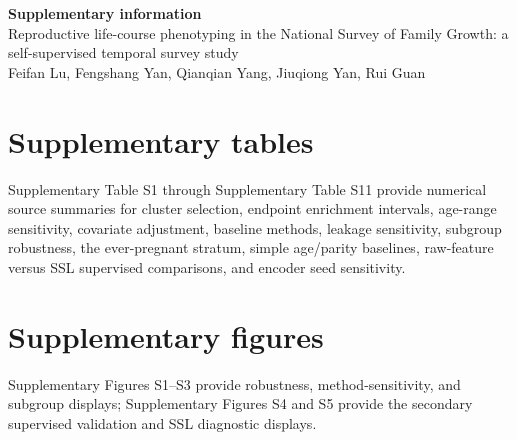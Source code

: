 \documentclass[11pt]{article}
\begin{document}
\begin{center}
{\Large\bfseries Supplementary information}\\[0.75em]
{\large Reproductive life-course phenotyping in the National Survey of Family Growth: a self-supervised temporal survey study}\\[0.75em]
Feifan Lu, Fengshang Yan, Qianqian Yang, Jiuqiong Yan, Rui Guan
\end{center}

\section*{Supplementary tables}

Supplementary Table S1 through Supplementary Table S11 provide numerical source summaries for cluster selection, endpoint enrichment intervals, age-range sensitivity, covariate adjustment, baseline methods, leakage sensitivity, subgroup robustness, the ever-pregnant stratum, simple age/parity baselines, raw-feature versus SSL supervised comparisons, and encoder seed sensitivity.























\clearpage

\section*{Supplementary figures}

Supplementary Figures S1--S3 provide robustness, method-sensitivity, and subgroup displays; Supplementary Figures S4 and S5 provide the secondary supervised validation and SSL diagnostic displays.
\end{document}
